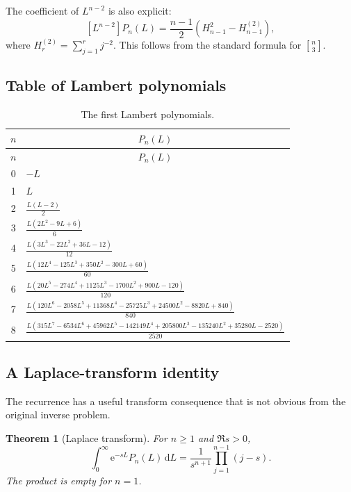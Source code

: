 \documentclass[11pt]{article}
\theoremstyle{pltheorem}
\newtheorem{theorem}{Theorem}[section]
\newcommand{\dd}{\,\mathrm d}
\newcommand{\e}{\mathrm e}
\newcommand{\stirlingone}[2]{\genfrac{[}{]}{0pt}{}{#1}{#2}}
\begin{document}
The coefficient of \(L^{n-2}\) is also explicit:
\begin{equation}\label{eq:P-third-leading}
 [L^{n-2}]P_n(L)
 =\frac{n-1}{2}\left(H_{n-1}^2-H_{n-1}^{(2)}\right),
\end{equation}
where \(H_r^{(2)}=\sum_{j=1}^rj^{-2}\).  This follows from the standard formula for \(\stirlingone{n}{3}\).

\subsection{Table of Lambert polynomials}

{\small
\begin{longtable}{@{}c p{}@{}}
\caption{The first Lambert polynomials.}\label{tab:Lambert-polynomials}\\
\toprule
\(n\)&\multicolumn{1}{c}{\(P_n(L)\)}\\
\midrule
\endfirsthead
\toprule
\(n\)&\multicolumn{1}{c}{\(P_n(L)\)}\\
\midrule
\endhead
0&\(-L\)\\[0.35em]
1&\(L\)\\[0.35em]
2&\(\displaystyle\frac{L(L-2)}2\)\\[0.55em]
3&\(\displaystyle\frac{L(2L^2-9L+6)}6\)\\[0.55em]
4&\(\displaystyle\frac{L(3L^3-22L^2+36L-12)}{12}\)\\[0.55em]
5&\(\displaystyle\frac{L(12L^4-125L^3+350L^2-300L+60)}{60}\)\\[0.55em]
6&\(\displaystyle\frac{L(20L^5-274L^4+1125L^3-1700L^2+900L-120)}{120}\)\\[0.55em]
7&\(\displaystyle\frac{L(120L^6-2058L^5+11368L^4-25725L^3+24500L^2-8820L+840)}{840}\)\\[0.55em]
8&\(\displaystyle\frac{L(315L^7-6534L^6+45962L^5-142149L^4+205800L^3-135240L^2+35280L-2520)}{2520}\)\\
\bottomrule
\end{longtable}
}

\subsection{A Laplace-transform identity}

The recurrence has a useful transform consequence that is not obvious from the original inverse problem.

\begin{theorem}[Laplace transform]\label{thm:P-Laplace}
For \(n\ge1\) and \(\Re s>0\),
\begin{equation}\label{eq:P-Laplace}
 \boxed{\quad
 \int_0^\infty\e^{-sL}P_n(L)\dd L
 =\frac{1}{s^{n+1}}\prod_{j=1}^{n-1}(j-s).
 \quad}
\end{equation}
The product is empty for \(n=1\).
\end{theorem}
\end{document}
